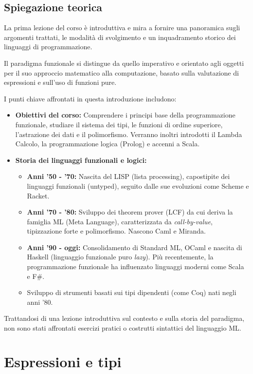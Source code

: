 \documentclass[12pt, a4paper]{article}
\begin{document}
\subsection{Spiegazione teorica}
La prima lezione del corso è introduttiva e mira a fornire una panoramica sugli argomenti trattati, le modalità di svolgimento e un inquadramento storico dei linguaggi di programmazione.

Il paradigma funzionale si distingue da quello imperativo e orientato agli oggetti per il suo approccio matematico alla computazione, basato sulla valutazione di espressioni e sull'uso di funzioni pure. 

I punti chiave affrontati in questa introduzione includono:
\begin{itemize}
    \item \textbf{Obiettivi del corso:} Comprendere i principi base della programmazione funzionale, studiare il sistema dei tipi, le funzioni di ordine superiore, l'astrazione dei dati e il polimorfismo. Verranno inoltri introdotti il Lambda Calcolo, la programmazione logica (Prolog) e accenni a Scala.
    \item \textbf{Storia dei linguaggi funzionali e logici:}
    \begin{itemize}
        \item \textbf{Anni '50 - '70:} Nascita del LISP (lista processing), capostipite dei linguaggi funzionali (untyped), seguito dalle sue evoluzioni come Scheme e Racket.
        \item \textbf{Anni '70 - '80:} Sviluppo dei theorem prover (LCF) da cui deriva la famiglia ML (Meta Language), caratterizzata da \textit{call-by-value}, tipizzazione forte e polimorfismo. Nascono Caml e Miranda.
        \item \textbf{Anni '90 - oggi:} Consolidamento di Standard ML, OCaml e nascita di Haskell (linguaggio funzionale puro \textit{lazy}). Più recentemente, la programmazione funzionale ha influenzato linguaggi moderni come Scala e F\#.
        \item Sviluppo di strumenti basati sui tipi dipendenti (come Coq) nati negli anni '80.
    \end{itemize}
\end{itemize}

Trattandosi di una lezione introduttiva sul contesto e sulla storia del paradigma, non sono stati affrontati esercizi pratici o costrutti sintattici del linguaggio ML.

\section{Espressioni e tipi}
\end{document}
